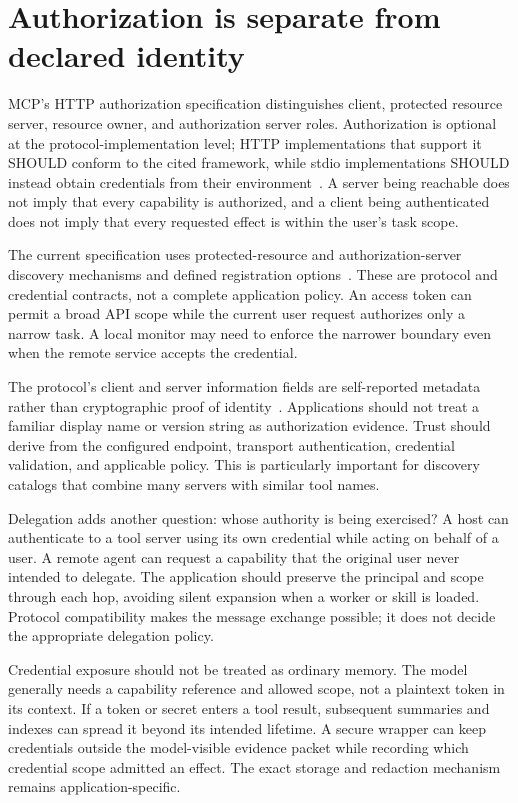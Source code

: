 \section{Authorization is separate from declared identity}\label{sec:C19:authorization}
MCP's HTTP authorization specification distinguishes client, protected resource server, resource owner, and authorization server roles. Authorization is optional at the protocol-implementation level; HTTP implementations that support it SHOULD conform to the cited framework, while stdio implementations SHOULD instead obtain credentials from their environment~\cite{mcp2026auth}. A server being reachable does not imply that every capability is authorized, and a client being authenticated does not imply that every requested effect is within the user's task scope.

The current specification uses protected-resource and authorization-server discovery mechanisms and defined registration options~\cite{mcp2026auth}. These are protocol and credential contracts, not a complete application policy. An access token can permit a broad API scope while the current user request authorizes only a narrow task. A local monitor may need to enforce the narrower boundary even when the remote service accepts the credential.

The protocol's client and server information fields are self-reported metadata rather than cryptographic proof of identity~\cite{mcp2026discover}. Applications should not treat a familiar display name or version string as authorization evidence. Trust should derive from the configured endpoint, transport authentication, credential validation, and applicable policy. This is particularly important for discovery catalogs that combine many servers with similar tool names.

Delegation adds another question: whose authority is being exercised? A host can authenticate to a tool server using its own credential while acting on behalf of a user. A remote agent can request a capability that the original user never intended to delegate. The application should preserve the principal and scope through each hop, avoiding silent expansion when a worker or skill is loaded. Protocol compatibility makes the message exchange possible; it does not decide the appropriate delegation policy.

Credential exposure should not be treated as ordinary memory. The model generally needs a capability reference and allowed scope, not a plaintext token in its context. If a token or secret enters a tool result, subsequent summaries and indexes can spread it beyond its intended lifetime. A secure wrapper can keep credentials outside the model-visible evidence packet while recording which credential scope admitted an effect. The exact storage and redaction mechanism remains application-specific.

